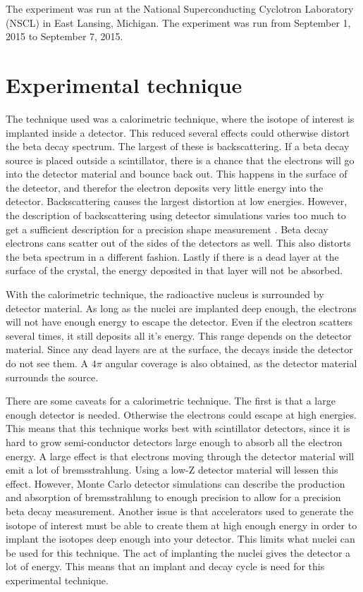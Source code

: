 The experiment was run at the National Superconducting Cyclotron Laboratory (NSCL) in East Lansing, Michigan. 
The experiment was run from September 1, 2015 to September 7, 2015.

\section{Experimental technique}
The technique used was a calorimetric technique, where the isotope of interest is implanted inside a detector.
This reduced several effects could otherwise distort the beta decay spectrum.
The largest of these is backscattering.
If a beta decay source is placed outside a scintillator, there is a chance that the electrons will go into the detector material and bounce back out.
This happens in the surface of the detector, and therefor the electron deposits very little energy into the detector. 
Backscattering causes the largest distortion at low energies.
However, the description of backscattering using detector simulations varies too much to get a sufficient description for a precision shape measurement \cite{Huy18}.
Beta decay electrons cans scatter out of the sides of the detectors as well. 
This also distorts the beta spectrum in a different fashion. 
Lastly if there is a dead layer at the surface of the crystal, the energy deposited in that layer will not be absorbed.

With the calorimetric technique, the radioactive nucleus is surrounded by detector material.
As long as the nuclei are implanted deep enough, the electrons will not have enough energy to escape the detector.
Even if the electron scatters several times, it still deposits all it's energy.
This range depends on the detector material.
Since any dead layers are at the surface, the decays inside the detector do not see them.
A $4\pi$ angular coverage is also obtained, as the detector material surrounds the source.

There are some caveats for a calorimetric technique. 
The first is that a large enough detector is needed.
Otherwise the electrons could escape at high energies.
This means that this technique works best with scintillator detectors, since it is hard to grow semi-conductor detectors large enough to absorb all the electron energy.  
A large effect is that electrons moving through the detector material will emit a lot of bremsstrahlung.
Using a low-Z detector material will lessen this effect.
However, Monte Carlo detector simulations can describe the production and absorption of bremsstrahlung to enough precision to allow for a precision beta decay measurement. 
Another issue is that accelerators used to generate the isotope of interest must be able to create them at high enough energy in order to implant the isotopes deep enough into your detector.
This limits what nuclei can be used for this technique.
The act of implanting the nuclei gives the detector a lot of energy. 
This means that an implant and decay cycle is need for this experimental technique.


